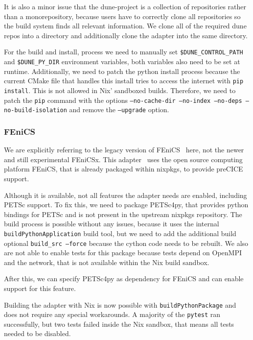 \documentclass{eceasst}
\begin{document}
It is also a minor issue that the dune-project is a collection of repositories rather than a monorepository, because users have to correctly clone all repositories so the build system finds all relevant information.
We clone all of the required dune repos into a directory and additionally clone the adapter into the same directory.

For the build and install, process we need to manually set \texttt{\$DUNE\_CONTROL\_PATH} and \texttt{\$DUNE\_PY\_DIR} environment variables, both variables also need to be set at runtime.
Additionally, we need to patch the python install process because the current CMake file that handles this install tries to access the internet with \texttt{pip install}.
This is not allowed in Nix' sandboxed builds.
Therefore, we need to patch the \texttt{pip} command with the options \texttt{--no-cache-dir --no-index --no-deps --no-build-isolation} and remove the \texttt{--upgrade} option.\\

\subsubsection{FEniCS}

We are explicitly referring to the legacy version of FEniCS~\cite{fenics} here, not the newer and still experimental FEniCSx.
This adapter~\cite{Rodenberg2021} uses the open source computing platform FEniCS, that is already packaged within nixpkgs, to provide preCICE support.

Although it is available, not all features the adapter needs are enabled, including PETSc support.
To fix this, we need to package PETSc4py, that provides python bindings for PETSc and is not present in the upstream nixpkgs repository.
The build process is possible without any issues, because it uses the internal \texttt{buildPythonApplication} build tool, but we need to add the additional build optional \texttt{build\_src --force} because the cython code needs to be rebuilt.
We also are not able to enable tests for this package because tests depend on OpenMPI and the network, that is not available within the Nix build sandbox.

After this, we can specify PETSc4py as dependency for FEniCS and can enable support for this feature.

Building the adapter with Nix is now possible with \texttt{buildPythonPackage} and does not require any special workarounds.
A majority of the \texttt{pytest} ran successfully, but two tests failed inside the Nix sandbox, that means all tests needed to be disabled.\\
\end{document}
